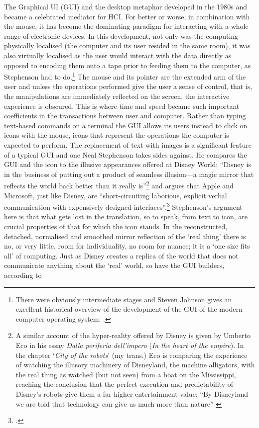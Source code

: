 \label{sec:human-comp-inter:par2}
The Graphical UI (GUI) and the desktop metaphor developed in the 1980s and became a celebrated mediator for HCI. For better or worse, in combination with the mouse, it has become the dominating paradigm for interacting with a whole range of electronic devices. In this development, not only was the computing physically localised (the computer and its user resided in the same room), it was also virtually localised as the user would interact with the data directly as opposed to encoding them onto a tape prior to feeding them to the computer, as Stephenson had to do.\footnote{There were obviously intermediate stages and Steven Johnson gives an excellent historical overview of the development of the GUI of the modern computer operating system: \cite[chap. 2 \& 3]{johnson97}.} The mouse and its pointer are the extended arm of the user and unless the operations performed give the user a sense of control, that is, the manipulations are immediately reflected on the screen, the interactive experience is obscured. This is where time and speed became such important coefficients in the transactions between user and computer. Rather than typing text-based commands on a terminal the GUI allows its users instead to click on icons with the mouse, icons that represent the operations the computer is expected to perform. The replacement of text with images is a significant feature of a typical GUI and one Neal Stephenson takes sides against. He compares the GUI and the icon to the illusive appearances offered at Disney World: ``Disney is in the business of putting out a product of seamless illusion---a magic mirror that reflects the world back better than it really is''\footnote{A similar account of the hyper-reality offered by Disney is given by Umberto Eco in his essay \emph{Dalla periferia dell'impero} (\emph{In the heart of the empire}). In the chapter `\emph{City of the robots}' (my trans.) Eco is comparing the experience of watching the illusory machinery of Disneyland, the machine alligators, with the real thing as watched (but not seen) from a boat on the Mississippi, reaching the conclusion that the perfect execution and predictability of Disney's robots give them a far higher entertainment value: ``By Disneyland we are told that technology can give us much more than nature'' \cite[53]{eco87}} and argues that Apple and Microsoft, just like Disney, are ``short-circuiting laborious, explicit verbal communication with expensively designed interfaces''.\footcite[chap. `Interface Culture', \S~12 and \S~20]{stephenson99} Stephenson's argument here is that what gets lost in the translation, so to speak, from text to icon, are crucial properties of that for which the icon stands. In the reconstructed, detached, normalised and smoothed mirror reflection of the `real thing' there is no, or very little, room for individuality, no room for nuance; it is a `one size fits all' of computing. Just as Disney creates a replica of the world that does not communicate anything about the `real' world, so have the GUI builders, according to 